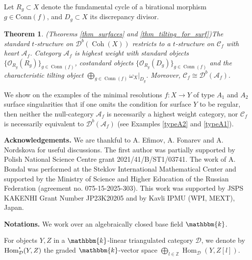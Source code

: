 \documentclass[12pt,a4paper]{amsart}
\newcommand{\aA}{{\mathcal{A}}}
\newcommand{\cC}{{\mathcal{C}}}
\newcommand{\dD}{{\mathcal{D}}}
\newcommand{\oO}{{\mathcal{O}}}
\newcommand{\kk}{\mathbbm{k}}
\newcommand{\tr}{{\mbox{$t$-struc}\-tu\-r}}
\newcommand{\bcdot}{{\mbox{\boldmath{$\cdot$}}}}
\newcommand{\Hom}{\mathop{\textrm{Hom}}\nolimits}
\newcommand{\Coh}{\mathop{\operatorname{Coh}}\nolimits}
\newcommand{\Conn}{\mathop{\textrm{Conn}}\nolimits}
\newtheorem{THM}[LEM]{Theorem}
\theoremstyle{definition}
\begin{document}
Let $R_g\subset X$ denote the fundamental cycle of a birational morphism $g\in \textrm{Conn}(f) $, and $D_g\subset X$ its discrepancy divisor. 


\begin{THM}(Theorems \ref{thm_surfaces} and \ref{thm_tilting_for_surf})\label{thm_intro_surfaces}
	The standard \tr e on $\dD^b(\Coh(X))$ restricts to a \tr e on $\cC_f$ with heart $\mathscr{A}_f $.  Category $\mathscr{A}_f$ is highest weight with standard objects $\{\oO_{R_g}(R_g)\}_{g\in \Conn(f)}$, costandard objects $\{\oO_{R_g}(D_g)\}_{g\in \Conn(f)}$ and the characteristic tilting object  $\bigoplus_{g\in \Conn(f)} \omega_X|_{D_g}$.
	Moreover, $\cC_f\cong \dD^b(\mathscr{A}_f)$. 
\end{THM}


We show on the examples of the minimal resolutions $f: X\to Y$  of type  $A_1$ and $A_2$ surface singularities that if one omits the condition for surface $Y$ to be regular, then neither the null-category $\mathscr{A}_f$ is necessarily a highest weight category, nor $\cC_f$ is necessarily equivalent to $\dD^b(\mathscr{A}_f)$ (see Examples \ref{typeA2} and \ref{typeA1}).

\vspace{0.3cm}
\noindent
\textbf{Acknowledgements.} We are thankful to A. Efimov, A. Fonarev and A. Nordskova for useful discussions. 
 The first author was partially supported by Polish National Science Centre grant 2021/41/B/ST1/03741.  
The work of A. Bondal was performed at the Steklov International Mathematical Center and supported by the Ministry of Science and Higher Education of the Russian Federation (agreement no. 075-15-2025-303). This work was supported by JSPS KAKENHI Grant Number JP23K20205 and by Kavli IPMU (WPI, MEXT), Japan.




\vspace{0.3cm}
\noindent
\textbf{Notations.}
We work over an algebraically closed base field $\kk$. 

For objects $Y,Z$ in a $\kk$-linear triangulated category $\dD$, we denote by $\Hom_{\dD}^{\bcdot}(Y,Z)$ the graded $\kk$-vector space $\bigoplus_{l\in \mathbb{Z}}\Hom_{\dD}(Y,Z[l])$.
\end{document}
